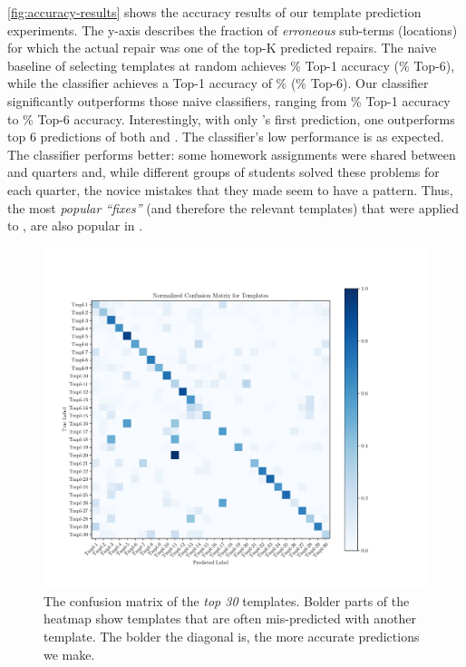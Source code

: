 %
\autoref{fig:accuracy-results} shows the accuracy results of our template
prediction experiments. The y-axis describes the fraction of \emph{erroneous}
sub-terms (locations) for which the actual repair was one of the top-K predicted 
repairs.
%
The naive baseline of selecting templates at random achieves 
\RandomTopOne\% Top-1 accuracy (\RandomTopSix\% Top-6), while 
the \popular classifier achieves a Top-1 accuracy of \PopularTopOne\%
(\PopularTopSix\% Top-6).
%
Our \dnn classifier significantly outperforms those naive 
classifiers, ranging from \DnnTopOne\% Top-1 accuracy to 
\DnnTopSix\% Top-6 accuracy. 
%
Interestingly, with only \dnn's first prediction, one
outperforms top 6 predictions of both \random and \popular.
%
The \random classifier's low performance is as expected.
%
The \popular classifier performs better: some homework assignments 
were shared between \SPRING and \FALL quarters and, while different 
groups of students solved these problems for each quarter, the novice
mistakes that they made seem to have a pattern. Thus, the most
\emph{popular ``fixes''} (and therefore the relevant templates) 
that were applied to \SPRING, are also popular in \FALL. 



\begin{figure}[t]
  \centering
  \includegraphics[trim={30 40 100 70},clip,width=\linewidth]{evaluation-conf-matrix.pdf}
  \caption{The confusion matrix of the \emph{top 30} templates. Bolder parts of
  the heatmap show templates that are often mis-predicted with another template.
  The bolder the diagonal is, the more accurate predictions we make.}
  \label{fig:conf-matrix}
\end{figure}

